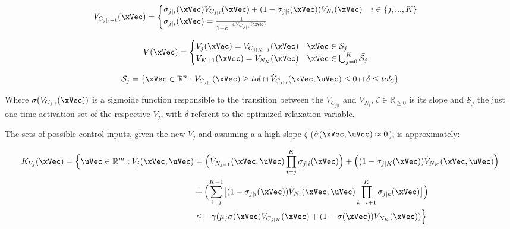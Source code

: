\begin{align}
    V_{C_{j|i+1}}(\xVec) = 
    \begin{cases}
        \sigma_{j|i}(\xVec) V_{C_{j|i}}(\xVec) + (1 - \sigma_{j|i}(\xVec))V_{N_{i}}(\xVec) \quad i \in \{j,...,K\}\\
        \sigma_{j|i}(\xVec) = \frac{1}{1+e^{-\zeta V_{C_{j|i}}(\xVec)}} 
    \end{cases}
    \label{eq:1stPhase_New_M-CLF-S}
\end{align}

\begin{align}
    V(\xVec) = 
    \begin{cases}
        V_j(\xVec) = V_{C_{j|K+1}}(\xVec) \quad \xVec \in \mathcal{S}_j\\
        V_{K+1}(\xVec) = V_{N_{K}}(\xVec) \quad \xVec \in \bigcup^{K}_{j=0} \bar{\mathcal{S}_j}
    \end{cases}
    \label{eq:New_M-CLF-S}
\end{align}

\begin{equation}
    \mathcal{S}_j = \{\xVec \in \mathbb{R}^n: V_{C_{j|j}}(\xVec) \geq tol \cap \dot{V}_{C_{j|j}}(\xVec, \uVec) \leq 0 \cap \delta \leq tol_2 \}
    \label{eq:New_M-CLF-S_actuationPhaseSet}
\end{equation}

Where \(\sigma(V_{C_{j|i}}(\xVec))\) is a sigmoide function responsible to the transition between the  \(V_{C_{j|i}}\) and \(V_{N_{i}}\), \(\zeta \in \mathbb{R}_{\geq 0}\) is its slope and \(\mathcal{S}_j\) the just one time activation set of the respective  \(V_j\), with \(\delta\) referent to the   optimized relaxation variable. 



The sets of possible control inputs, given the new  \(V_j\) and assuming a a high slope \(\zeta\) (\(\dot{\sigma}(\xVec, \uVec)\approx 0\)), is approximately:

\begin{align}
    K_{V_{j}}(\xVec) = \Bigl\{\uVec \in \mathbb{R}^m: \dot{V_j}(\xVec, \uVec) &= \Bigl(\dot{V}_{N_{j-1}}(\xVec, \uVec) \prod^K_{i=j}\sigma_{j|i}(\xVec)\Bigr) + \Bigl((1-\sigma_{j|K}(\xVec))\dot{V}_{N_{K}}(\xVec, \uVec)\Bigr) \notag \\
    &+\Bigl(\sum_{i=j}^{K-1} \bigl[(1-\sigma_{j|i}(\xVec))\dot{V}_{N_{i}}(\xVec, \uVec) \prod^K_{k=i+1} \sigma_{j|k}(\xVec)\bigr]\Bigr) \notag\\
    &\leq -\gamma( \mu_{j}\sigma(\xVec) V_{C_{j|K}}(\xVec) + (1 - \sigma(\xVec))V_{N_{K}}(\xVec)  )\Bigr\}
    \label{eq:M-CLF-S_Constraint}
\end{align}

